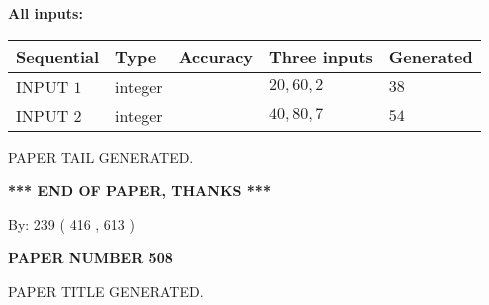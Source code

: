 \documentclass{ctexart}
\begin{document}
   
   
   
\noindent\vspace{0.1in}\hspace{-0.08in} {\textbf{\Large{All inputs: }}}
   
   
  
  
\noindent\begin{tabular}{|l|l|l|l|l|}
\hline
 Sequential & Type & Accuracy & Three inputs & Generated \\ 
\hline
 
 
  INPUT $  1 $ & integer &  & $
 20
 , 
 60
 , 
 2
 $ & $ 38 $ 
 \\  \hline  
 
 
  INPUT $  2 $ & integer &  & $
 40
 , 
 80
 , 
 7
 $ & $ 54 $ 
 \\  \hline  
 \end{tabular}
   
   
   
   
   
   
 \vspace{0.2in}
 
   
   
\vspace{2.0in} PAPER TAIL GENERATED.
   
   
   
   
\vspace{1.0in} 
{\textbf{\large{ *** END OF PAPER, THANKS *** }}} 
   
   
\hspace{1.0in} By: 
 239 ( 416 ,  613 )
   
   
   
   
\newpage 
\setcounter{page}{ 
   508001 } 
   
   
   
   
 {\textbf{ \Large{ PAPER NUMBER  508  }}}
   
   
\vspace{0.2in}
   
   
   
   
   
   
   
   
 \vspace{0.2in}
 
 
 
 
   
   
 PAPER TITLE GENERATED.
   
   
   
\vspace{0.2in}
   
\end{document}

